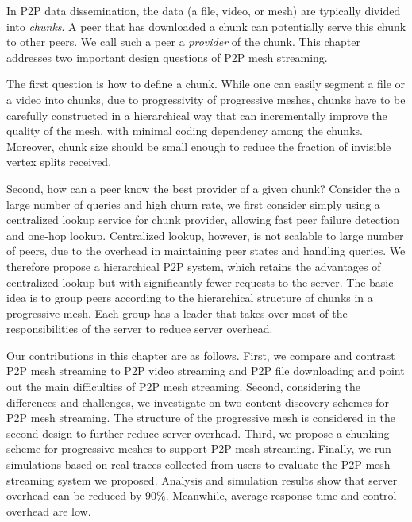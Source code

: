     In P2P data dissemination, the data (a file, video, or
    mesh) are typically divided into \textit{chunks}.  A
    peer that has downloaded a chunk can potentially serve
    this chunk to other peers.  We call such a peer a
    \textit{provider} of the chunk.  This chapter addresses
    two important design questions of P2P mesh streaming.

    The first question is how to define a chunk.  While one 
    can easily segment a 
    file or a video into chunks, due to progressivity
    of progressive meshes, chunks have to be carefully 
    constructed in a hierarchical way that can
    incrementally improve the quality of the mesh, with
    minimal coding dependency among the chunks.
    Moreover, chunk size should be small enough to 
    reduce the fraction of invisible vertex splits
    received. 

    Second, how can
    a peer know the best provider of a given chunk?   
    Consider the a large number of queries and high churn
    rate, we first consider simply using a 
    centralized lookup service for chunk provider,
    allowing fast peer failure detection and one-hop lookup.
    Centralized lookup, however, is not scalable to large
    number of peers, due to the overhead in maintaining
    peer states and handling queries.
    We therefore propose a hierarchical P2P
    system, which retains the advantages of centralized
    lookup but with significantly fewer 
    requests to the server.  The
    basic idea is to group peers according to the
    hierarchical structure of chunks in a progressive mesh.
    Each group has a leader that takes over most of the responsibilities of the server to
    reduce server overhead.
    
    Our contributions in this chapter are as follows.
    First, we compare and contrast P2P mesh streaming to P2P
    video streaming and P2P file downloading and point out
    the main difficulties of P2P mesh streaming.  Second, 
    considering the differences and challenges, 
    we investigate on two content discovery schemes for P2P
    mesh streaming.  The structure of the progressive
    mesh is considered in the second design to further
    reduce server overhead.  Third, we propose a 
    chunking scheme for progressive meshes to support P2P mesh
    streaming.  Finally, we run simulations based on real
    traces collected from users to evaluate the P2P
    mesh streaming system we proposed.  Analysis and
    simulation results show that server overhead can be
    reduced by 90\%. Meanwhile,  average response time and
    control overhead are low.

